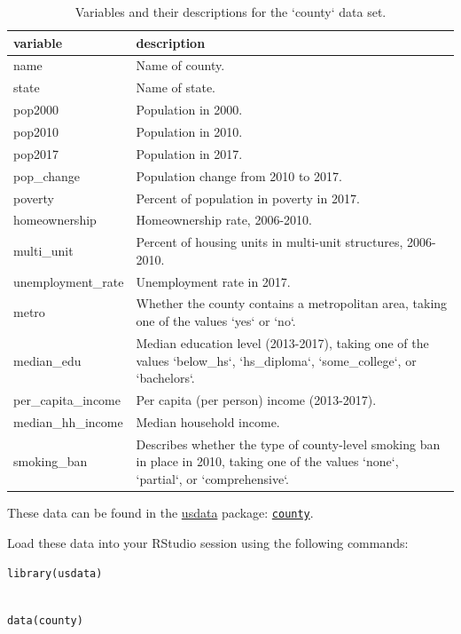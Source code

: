 \documentclass[
  10pt,
  openany]{book}
\theoremstyle{definition}
\theoremstyle{definition}
\theoremstyle{definition}
\theoremstyle{definition}
\theoremstyle{remark}
\begin{document}
\begin{table}

\caption{\label{tab:countyVariables}Variables and their descriptions for the `county` data set.}
\centering
\begin{tabular}[t]{l|l}
\hline
variable & description\\
\hline
name & Name of county.\\
\hline
state & Name of state.\\
\hline
pop2000 & Population in 2000.\\
\hline
pop2010 & Population in 2010.\\
\hline
pop2017 & Population in 2017.\\
\hline
pop\_change & Population change from 2010 to 2017.\\
\hline
poverty & Percent of population in poverty in 2017.\\
\hline
homeownership & Homeownership rate, 2006-2010.\\
\hline
multi\_unit & Percent of housing units in multi-unit structures, 2006-2010.\\
\hline
unemployment\_rate & Unemployment rate in 2017.\\
\hline
metro & Whether the county contains a metropolitan area, taking one of the values `yes` or `no`.\\
\hline
median\_edu & Median education level (2013-2017), taking one of the values `below\_hs`, `hs\_diploma`, `some\_college`, or `bachelors`.\\
\hline
per\_capita\_income & Per capita (per person) income (2013-2017).\\
\hline
median\_hh\_income & Median household income.\\
\hline
smoking\_ban & Describes whether the type of county-level smoking ban in place in 2010, taking one of the values `none`, `partial`, or `comprehensive`.\\
\hline
\end{tabular}
\end{table}

These data can be found in the \href{http://openintrostat.github.io/usdata}{usdata} package: \href{http://openintrostat.github.io/usdata/reference/county.html}{\texttt{county}}.

Load these data into your RStudio session using the following commands:

\texttt{library(usdata)}\strut \\
\texttt{data(county)}
\end{document}
